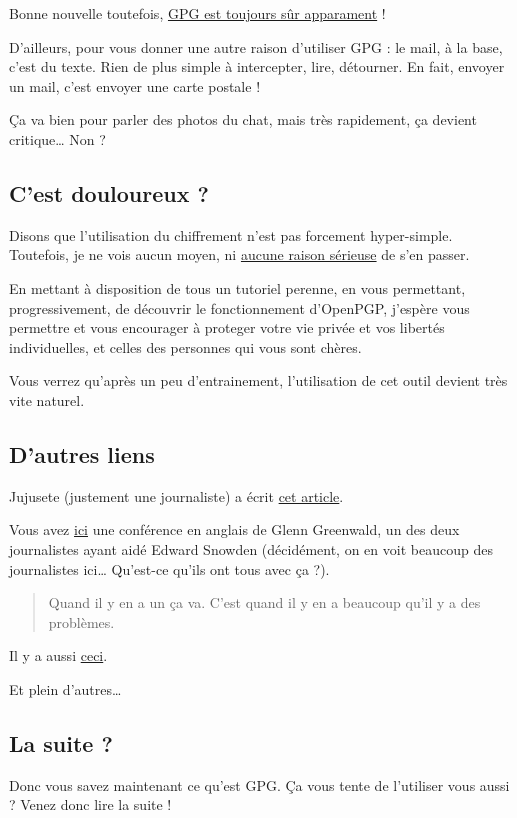 Bonne nouvelle toutefois,
\href{http://www.ginjfo.com/actualites/politique-et-economie/espionnage-nsa-depose-les-armes-devant-certaines-solutions-cryptage-20141230}{GPG
est toujours sûr apparament} !

D'ailleurs, pour vous donner une autre raison d'utiliser GPG : le mail,
à la base, c'est du texte. Rien de plus simple à intercepter, lire,
détourner. En fait, envoyer un mail, c'est envoyer une carte postale !

Ça va bien pour parler des photos du chat, mais très rapidement, ça
devient critique\ldots{} Non ?

\subsection{C'est douloureux ?}\label{cest-douloureux}

Disons que l'utilisation du chiffrement n'est pas forcement
hyper-simple. Toutefois, je ne vois aucun moyen, ni
\href{http://www.itespresso.fr/nsa-se-mobilise-casser-chiffrement-donnees-85704.html}{aucune
raison sérieuse} de s'en passer.

En mettant à disposition de tous un tutoriel perenne, en vous
permettant, progressivement, de découvrir le fonctionnement d'OpenPGP,
j'espère vous permettre et vous encourager à proteger votre vie privée
et vos libertés individuelles, et celles des personnes qui vous sont
chères.

Vous verrez qu'après un peu d'entrainement, l'utilisation de cet outil
devient très vite naturel.

\subsection{D'autres liens}\label{dautres-liens}

Jujusete (justement une journaliste) a écrit
\href{http://seteici.ondule.fr/2013/05/emails-sortez-couverts/}{cet article}.

Vous avez
\href{https://www.ted.com/talks/glenn_greenwald_why_privacy_matters}{ici}
une conférence en anglais de Glenn Greenwald, un des deux journalistes
ayant aidé Edward Snowden (décidément, on en voit beaucoup des
journalistes ici\ldots{} Qu'est-ce qu'ils ont tous avec ça ?).

\begin{quote}
Quand il y en a un ça va. C'est quand il y en a beaucoup qu'il y a des
problèmes.
\end{quote}

Il y a aussi \href{http://www.uzine.net/article128.html}{ceci}.

Et plein d'autres\ldots{}

\subsection{La suite ?}\label{la-suite}

Donc vous savez maintenant ce qu'est GPG. Ça vous tente de l'utiliser
vous aussi ? Venez donc lire la suite !
